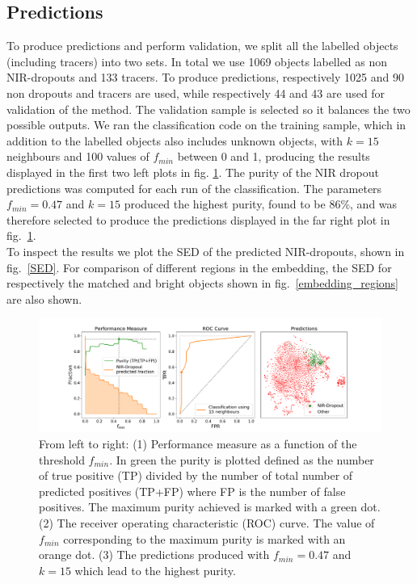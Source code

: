 \subsection{Predictions}
To produce predictions and perform validation, we split all the labelled objects (including tracers) into two sets. In total we use 1069 objects labelled as non NIR-dropouts and 133 tracers. To produce predictions, respectively 1025 and 90 non dropouts and tracers are used, while respectively 44 and 43 are used for validation of the method. The validation sample is selected so it balances the two possible outputs. We ran the classification code on the training sample, which in addition to the labelled objects also includes unknown objects, with $k=15$ neighbours and 100 values of $f_{min}$ between 0 and 1, producing the results displayed in the first two left plots in fig. \ref{classification_plot}. The purity of the NIR dropout predictions was computed for each run of the classification. The parameters $f_{min}=0.47$ and $k=15$ produced the highest purity, found to be 86\%, and was therefore selected to produce the predictions displayed in the far right plot in fig.~\ref{classification_plot}. \\

To inspect the results we plot the SED of the predicted NIR-dropouts, shown in fig.~\ref{SED}. For comparison of different regions in the embedding, the SED for respectively the matched and bright objects shown in fig.~\ref{embedding_regions} are also shown.

\begin{figure}[]
    \centering %
    \includegraphics[trim={3.5cm 0cm 4.5cm 0cm},clip,width=\textwidth]{Code/Saved_Figures/Classification_plot.pdf}
    \caption{From left to right: (1) Performance measure as a function of the threshold $f_{min}$. In green the purity is plotted defined as the number of true positive (TP) divided by the number of total number of predicted positives (TP+FP) where FP is the number of false positives. The maximum purity achieved is marked with a green dot. (2) The receiver operating characteristic (ROC) curve. The value of $f_{min}$ corresponding to the maximum purity is marked with an orange dot. (3) The predictions produced with $f_{min}=0.47$ and $k=15$ which lead to the highest purity.}
    \label{classification_plot}
\end{figure}

